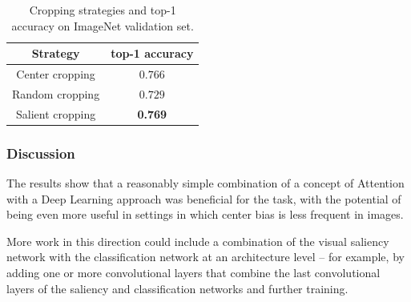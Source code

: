 \documentclass[12pt]{article}
\begin{document}
\begin{table}[H]
\centering
	\small
\caption{Cropping strategies and top-1 accuracy on ImageNet validation set.}
\begin{tabular}{|c|c|}
	\hline
    Strategy & top-1 accuracy\\
    \hline
    Center cropping & $0.766$\\
    \hline
    Random cropping & $0.729$\\
    \hline
    Salient cropping & \textbf{0.769}\\
    \hline
\end{tabular}
\label{table:results}
\end{table}

\subsubsection{Discussion}
The results show that a reasonably simple combination of a concept of Attention with a Deep Learning approach was beneficial for the task, with the potential of being even more useful in settings in which
center bias is less frequent in images.

More work in this direction could include a combination of the visual saliency network with
the classification network at an architecture level
-- for example, by adding one or more convolutional layers that combine the last convolutional layers
of the saliency and classification networks and further training.
\end{document}
